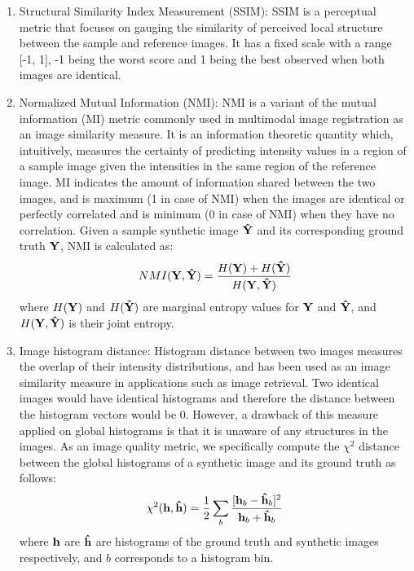 \begin{enumerate}
    
    \item Structural Similarity Index Measurement (SSIM): SSIM \cite{wang2004image} is a perceptual metric that focuses on gauging the similarity of perceived local structure between the sample and reference images. It has a fixed scale with a range [-1, 1], -1 being the worst score and 1 being the best observed when both images are identical.
    
    \item Normalized Mutual Information (NMI): NMI \cite{studholme1999overlap} is a variant of the mutual information (MI) metric commonly used in multimodal image registration as an image similarity measure. It is an information theoretic quantity which, intuitively, measures the certainty of predicting intensity values in a region of a sample image given the intensities in the same region of the reference image. MI indicates the amount of information shared between the two images, and is maximum (1 in case of NMI) when the images are identical or perfectly correlated and is minimum (0 in case of NMI) when they have no correlation. Given a sample synthetic image $\vb{\hat{Y}}$ and its corresponding ground truth $\vb{Y}$, NMI is calculated as: 
    \begin{equation}
        NMI(\vb{Y}, \vb{\hat{Y}}) = \frac{H(\vb{Y}) + H(\vb{\hat{Y}})}{H(\vb{Y}, \vb{\hat{Y}})}
        \label{eq:metric_nmi}
    \end{equation}
    where $H(\vb{Y})$ and $H(\vb{\hat{Y}})$ are marginal entropy values for $\vb{Y}$  and $\vb{\hat{Y}}$, and $H(\vb{Y}, \vb{\hat{Y}})$ is their joint entropy.
    
    \item Image histogram distance: Histogram distance between two images measures the overlap of their intensity distributions, and has been used as an image similarity measure in applications such as image retrieval. Two identical images would have identical histograms and therefore the distance between the histogram vectors would be 0. However, a drawback of this measure applied on global histograms is that it is unaware of any structures in the images. As an image quality metric, we specifically compute the $\chi^2$ distance between the global histograms of a synthetic image and its ground truth as follows: 
    \begin{equation}
        \chi^2(\vb{h}, \vb{\hat{h}}) = \frac{1}{2} \sum_{b} \frac{[\vb{h}_b - \vb{\hat{h}}_b]^2}{\vb{h}_b + \vb{\hat{h}}_b}
        \label{eq:metric_histogram}
    \end{equation}
    where $\vb{h}$ are $\vb{\hat{h}}$ are histograms of the ground truth and synthetic images respectively, and $b$ corresponds to a histogram bin.
    
\end{enumerate}

